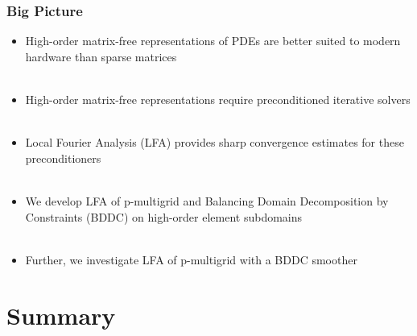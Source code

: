 \documentclass{beamer}
\begin{document}
\begin{frame}
\begin{center}
\frametitle{Big Picture}

\begin{itemize}

\item High-order matrix-free representations of PDEs are better suited to modern hardware than sparse matrices\\

~\\

\item High-order matrix-free representations require preconditioned iterative solvers\\

~\\

\item Local Fourier Analysis (LFA) provides sharp convergence estimates for these preconditioners\\

~\\

\item We develop LFA of p-multigrid and Balancing Domain Decomposition by Constraints (BDDC) on high-order element subdomains\\

~\\

\item Further, we investigate LFA of p-multigrid with a BDDC smoother

\end{itemize}

\end{center}
\end{frame}

\section{Summary}
\end{document}
